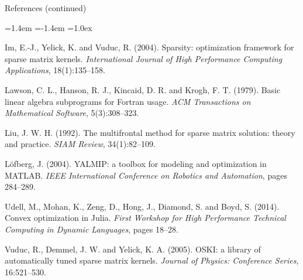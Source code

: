 \documentclass[10pt,mathserif,aspectratio=169]{beamer}
\begin{document}
\begin{frame}{References (continued)}
\vspace{-0.5ex}
{\footnotesize
\begin{list}{}{\leftmargin=1.4em \itemindent=-1.4em \itemsep=1.0ex
               \parsep=0pt \topsep=0pt}
\item Im, E.-J., Yelick, K. and Vuduc, R. (2004). Sparsity: optimization framework for sparse
      matrix kernels. \emph{International Journal of High Performance Computing
      Applications}, 18(1):135--158.
\item Lawson, C. L., Hanson, R. J., Kincaid, D. R. and Krogh, F. T. (1979). Basic linear
      algebra subprograms for Fortran usage. \emph{ACM Transactions on Mathematical
      Software}, 5(3):308--323.
\item Liu, J. W. H. (1992). The multifrontal method for sparse matrix solution: theory and
      practice. \emph{SIAM Review}, 34(1):82--109.
\item L\"ofberg, J. (2004). YALMIP: a toolbox for modeling and optimization in MATLAB.
      \emph{IEEE International Conference on Robotics and Automation}, pages 284--289.
\item Udell, M., Mohan, K., Zeng, D., Hong, J., Diamond, S. and Boyd, S. (2014). Convex
      optimization in Julia. \emph{First Workshop for High Performance Technical Computing in
      Dynamic Languages}, pages 18--28.
\item Vuduc, R., Demmel, J. W. and Yelick, K. A. (2005). OSKI: a library of automatically
      tuned sparse matrix kernels. \emph{Journal of Physics: Conference Series}, 16:521--530.
\end{list}}
\end{frame}
\end{document}
